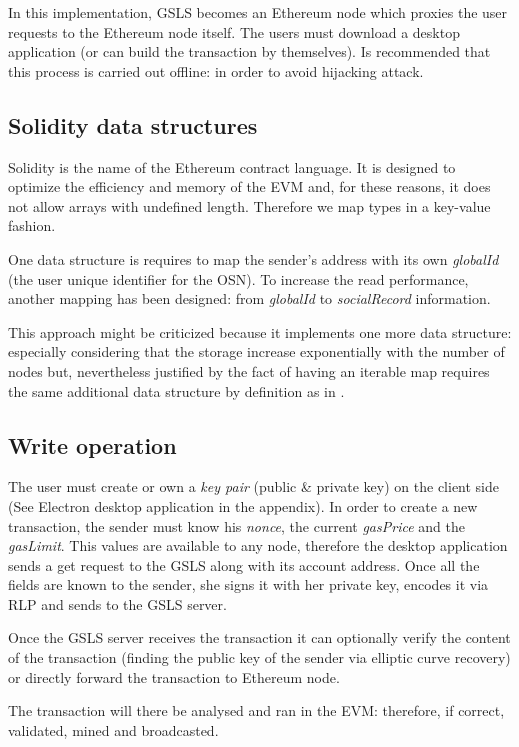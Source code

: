 In this implementation, GSLS becomes an Ethereum node which proxies the user requests to the Ethereum node itself.
The users must download a desktop application (or can build the transaction by themselves). Is recommended that this process is carried out offline: in order to avoid hijacking attack.

\subsection{Solidity data structures}
Solidity is the name of the Ethereum contract language. It is designed to optimize the efficiency and memory of the EVM and, for these reasons, it does not allow arrays with undefined length.
Therefore we map types in a key-value fashion.

One data structure is requires to map the sender's address with its own \textit{globalId} (the user unique identifier for the OSN).  To increase the read performance, another mapping has been designed: from \textit{globalId} to \textit{socialRecord} information.

This approach might be criticized because it implements one more data structure: especially considering that the storage increase exponentially with the number of nodes but, nevertheless justified by the fact of having an iterable map requires the same additional data structure by definition as in \cite{datastructure_solidity}.

\subsection{Write operation}
The user must create or own a \textit{key pair} (public \& private key) on the client side (See Electron desktop application in the appendix).
In order to create a new transaction, the sender must know his \textit{nonce}, the current \textit{gasPrice} and the \textit{gasLimit}. This values are available to any node, therefore the desktop application sends a get request to the GSLS along with its account address. Once all the fields are known to the sender, she signs it with her private key, encodes it via RLP and sends to the GSLS server.

Once the GSLS server receives the transaction it can optionally verify the content of the transaction (finding the public key of the sender via elliptic curve recovery) or directly forward the transaction to Ethereum node.

The transaction will there be analysed and ran in the EVM: therefore, if correct, validated, mined and broadcasted.



